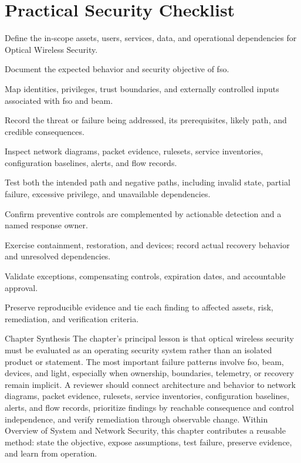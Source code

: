 \documentclass[11pt,letterpaper]{article}
\begin{document}
\section*{Practical Security Checklist}
\begin{CornellChecklist}
\item Define the in-scope assets, users, services, data, and operational dependencies for Optical Wireless Security.
\item Document the expected behavior and security objective of fso.
\item Map identities, privileges, trust boundaries, and externally controlled inputs associated with fso and beam.
\item Record the threat or failure being addressed, its prerequisites, likely path, and credible consequences.
\item Inspect network diagrams, packet evidence, rulesets, service inventories, configuration baselines, alerts, and flow records.
\item Test both the intended path and negative paths, including invalid state, partial failure, excessive privilege, and unavailable dependencies.
\item Confirm preventive controls are complemented by actionable detection and a named response owner.
\item Exercise containment, restoration, and devices; record actual recovery behavior and unresolved dependencies.
\item Validate exceptions, compensating controls, expiration dates, and accountable approval.
\item Preserve reproducible evidence and tie each finding to affected assets, risk, remediation, and verification criteria.
\end{CornellChecklist}
\begin{CornellSummaryBox}{Chapter Synthesis}
The chapter's principal lesson is that optical wireless security must be evaluated as an operating security system rather than an isolated product or statement. The most important failure patterns involve fso, beam, devices, and light, especially when ownership, boundaries, telemetry, or recovery remain implicit. A reviewer should connect architecture and behavior to network diagrams, packet evidence, rulesets, service inventories, configuration baselines, alerts, and flow records, prioritize findings by reachable consequence and control independence, and verify remediation through observable change. Within Overview of System and Network Security, this chapter contributes a reusable method: state the objective, expose assumptions, test failure, preserve evidence, and learn from operation.
\end{CornellSummaryBox}
\end{document}
